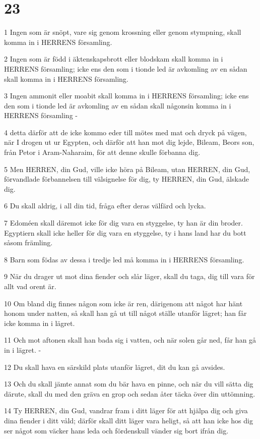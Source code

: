 \chapter{23}

\par 1 Ingen som är snöpt, vare sig genom krossning eller genom stympning, skall komma in i HERRENS församling.
\par 2 Ingen som är född i äktenskapsbrott eller blodskam skall komma in i HERRENS församling; icke ens den som i tionde led är avkomling av en sådan skall komma in i HERRENS församling.
\par 3 Ingen ammonit eller moabit skall komma in i HERRENS församling; icke ens den som i tionde led är avkomling av en sådan skall någonsin komma in i HERRENS församling -
\par 4 detta därför att de icke kommo eder till mötes med mat och dryck på vägen, när I drogen ut ur Egypten, och därför att han mot dig lejde, Bileam, Beors son, från Petor i Aram-Naharaim, för att denne skulle förbanna dig.
\par 5 Men HERREN, din Gud, ville icke höra på Bileam, utan HERREN, din Gud, förvandlade förbannelsen till välsignelse för dig, ty HERREN, din Gud, älskade dig.
\par 6 Du skall aldrig, i all din tid, fråga efter deras välfärd och lycka.
\par 7 Edoméen skall däremot icke för dig vara en styggelse, ty han är din broder. Egyptiern skall icke heller för dig vara en styggelse, ty i hans land har du bott såsom främling.
\par 8 Barn som födas av dessa i tredje led må komma in i HERRENS församling.
\par 9 När du drager ut mot dina fiender och slår läger, skall du taga, dig till vara för allt vad orent är.
\par 10 Om bland dig finnes någon som icke är ren, därigenom att något har hänt honom under natten, så skall han gå ut till något ställe utanför lägret; han får icke komma in i lägret.
\par 11 Och mot aftonen skall han bada sig i vatten, och när solen går ned, får han gå in i lägret. -
\par 12 Du skall hava en särskild plats utanför lägret, dit du kan gå avsides.
\par 13 Och du skall jämte annat som du bär hava en pinne, och när du vill sätta dig därute, skall du med den gräva en grop och sedan åter täcka över din uttömning.
\par 14 Ty HERREN, din Gud, vandrar fram i ditt läger för att hjälpa dig och giva dina fiender i ditt våld; därför skall ditt läger vara heligt, så att han icke hos dig ser något som väcker hans leda och fördenskull vänder sig bort ifrån dig.
